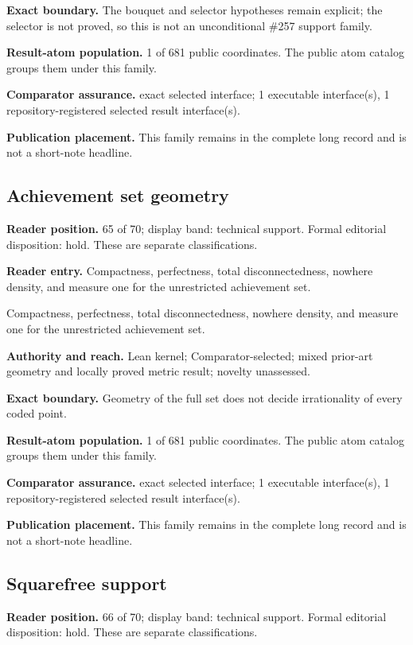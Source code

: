 \textbf{Exact boundary.} The bouquet and selector hypotheses remain explicit; the selector is not proved, so this is not an unconditional \#257 support family.

\textbf{Result-atom population.} 1 of 681 public coordinates. The public atom catalog groups them under this family.

\textbf{Comparator assurance.} exact selected interface; 1 executable interface(s), 1 repository-registered selected result interface(s).

\textbf{Publication placement.} This family remains in the complete long record and is not a short-note headline.

\subsection{Achievement set geometry}
\textbf{Reader position.} 65 of 70; display band: technical support.  Formal editorial disposition: hold.  These are separate classifications.

\textbf{Reader entry.} Compactness, perfectness, total disconnectedness, nowhere density, and measure one for the unrestricted achievement set.

Compactness, perfectness, total disconnectedness, nowhere density, and measure one for the unrestricted achievement set.

\textbf{Authority and reach.} Lean kernel; Comparator-selected; mixed prior-art geometry and locally proved metric result; novelty unassessed.

\textbf{Exact boundary.} Geometry of the full set does not decide irrationality of every coded point.

\textbf{Result-atom population.} 1 of 681 public coordinates. The public atom catalog groups them under this family.

\textbf{Comparator assurance.} exact selected interface; 1 executable interface(s), 1 repository-registered selected result interface(s).

\textbf{Publication placement.} This family remains in the complete long record and is not a short-note headline.

\subsection{Squarefree support}
\textbf{Reader position.} 66 of 70; display band: technical support.  Formal editorial disposition: hold.  These are separate classifications.

